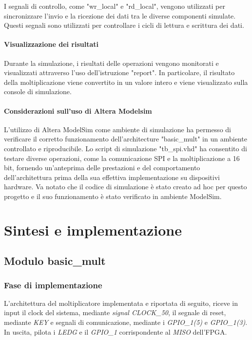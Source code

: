 \documentclass[titlepage]{report}
\begin{document}
				I segnali di controllo, come "wr\_local" e "rd\_local", vengono utilizzati per sincronizzare l'invio e la ricezione dei dati tra le diverse componenti simulate. Questi segnali sono utilizzati per controllare i cicli di lettura e scrittura dei dati.

			\subsubsection{Visualizzazione dei risultati}

				Durante la simulazione, i risultati delle operazioni vengono monitorati e visualizzati attraverso l'uso dell'istruzione "report". In particolare, il risultato della moltiplicazione viene convertito in un valore intero e viene visualizzato sulla console di simulazione.

			\subsubsection{Considerazioni sull'uso di Altera Modelsim}

				L'utilizzo di Altera ModelSim come ambiente di simulazione ha permesso di verificare il corretto funzionamento dell'architecture "basic\_mult" in un ambiente controllato e riproducibile. Lo script di simulazione "tb\_spi.vhd" ha consentito di testare diverse operazioni, come la comunicazione SPI e la moltiplicazione a 16 bit, fornendo un'anteprima delle prestazioni e del comportamento dell'architettura prima della sua effettiva implementazione su dispositivi hardware. Va notato che il codice di simulazione è stato creato ad hoc per questo progetto e il suo funzionamento è stato verificato in ambiente ModelSim.


\chapter*{Sintesi e implementazione}
\label{ch:sintesi_implementazione}
	\section*{Modulo basic\_mult}
	\label{sec:modulo_basic_mult}
		\subsection*{Fase di implementazione}
		\label{subsec:basic_mult_implementazione}
			L'architettura del moltiplicatore implementata e riportata di seguito, riceve in input il clock del sistema, mediante \textit{signal CLOCK\_50}, il segnale di reset, mediante \textit{KEY} e segnali di comunicazione, mediante i \textit{GPIO\_1(5)} e \textit{GPIO\_1(3)}. In uscita, pilota i \textit{LEDG} e il \textit{GPIO\_1} corrispondente al \textit{MISO} dell'FPGA.
\end{document}

